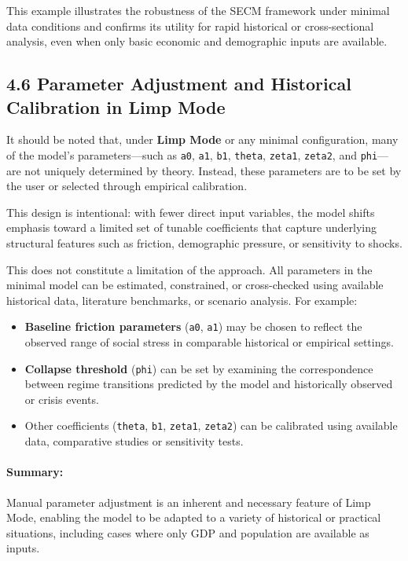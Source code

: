 \documentclass[12pt]{report}
\begin{document}
\noindent
This example illustrates the robustness of the SECM framework under minimal data conditions and confirms its utility for rapid historical or cross-sectional analysis, even when only basic economic and demographic inputs are available.

\subsection{4.6 Parameter Adjustment and Historical Calibration in Limp Mode}

It should be noted that, under \textbf{Limp Mode} or any minimal configuration, many of the model’s parameters—such as \texttt{a0}, \texttt{a1}, \texttt{b1}, \texttt{theta}, \texttt{zeta1}, \texttt{zeta2}, and \texttt{phi}—are not uniquely determined by theory. Instead, these parameters are to be set by the user or selected through empirical calibration.

This design is intentional: with fewer direct input variables, the model shifts emphasis toward a limited set of tunable coefficients that capture underlying structural features such as friction, demographic pressure, or sensitivity to shocks.

This does not constitute a limitation of the approach. All parameters in the minimal model can be estimated, constrained, or cross-checked using available historical data, literature benchmarks, or scenario analysis. For example:

\begin{itemize}
    \item \textbf{Baseline friction parameters} (\texttt{a0}, \texttt{a1}) may be chosen to reflect the observed range of social stress in comparable historical or empirical settings.
    \item \textbf{Collapse threshold} (\texttt{phi}) can be set by examining the correspondence between regime transitions predicted by the model and historically observed or crisis events.
    \item Other coefficients (\texttt{theta}, \texttt{b1}, \texttt{zeta1}, \texttt{zeta2}) can be calibrated using available data, comparative studies or sensitivity tests.
\end{itemize}

\paragraph{Summary:}
Manual parameter adjustment is an inherent and necessary feature of Limp Mode, enabling the model to be adapted to a variety of historical or practical situations, including cases where only GDP and population are available as inputs.
\end{document}
